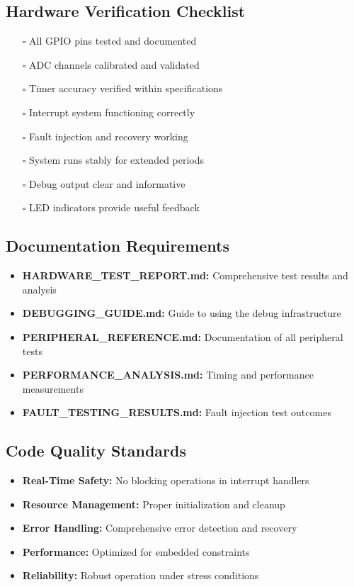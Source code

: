 \documentclass[11pt,a4paper]{article}
\begin{document}
\subsection{Hardware Verification Checklist}
\begin{itemize}
    \item[$\square$] All GPIO pins tested and documented
    \item[$\square$] ADC channels calibrated and validated
    \item[$\square$] Timer accuracy verified within specifications
    \item[$\square$] Interrupt system functioning correctly
    \item[$\square$] Fault injection and recovery working
    \item[$\square$] System runs stably for extended periods
    \item[$\square$] Debug output clear and informative
    \item[$\square$] LED indicators provide useful feedback
\end{itemize}

\subsection{Documentation Requirements}
\begin{itemize}
    \item \textbf{HARDWARE\_TEST\_REPORT.md:} Comprehensive test results and analysis
    \item \textbf{DEBUGGING\_GUIDE.md:} Guide to using the debug infrastructure
    \item \textbf{PERIPHERAL\_REFERENCE.md:} Documentation of all peripheral tests
    \item \textbf{PERFORMANCE\_ANALYSIS.md:} Timing and performance measurements
    \item \textbf{FAULT\_TESTING\_RESULTS.md:} Fault injection test outcomes
\end{itemize}

\subsection{Code Quality Standards}
\begin{itemize}
    \item \textbf{Real-Time Safety:} No blocking operations in interrupt handlers
    \item \textbf{Resource Management:} Proper initialization and cleanup
    \item \textbf{Error Handling:} Comprehensive error detection and recovery
    \item \textbf{Performance:} Optimized for embedded constraints
    \item \textbf{Reliability:} Robust operation under stress conditions
\end{itemize}
\end{document}
